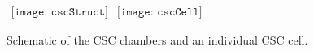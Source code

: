
    \begin{figure}[!Hhbt]
      \centering
      $ \begin{array}{cc}
        \texttt{[image: cscStruct]} &
        \texttt{[image: cscCell]}
      \end{array} $
      \caption{Schematic of the CSC chambers and an individual CSC cell.}
      \label{fig:cscSchem}
    \end{figure}

